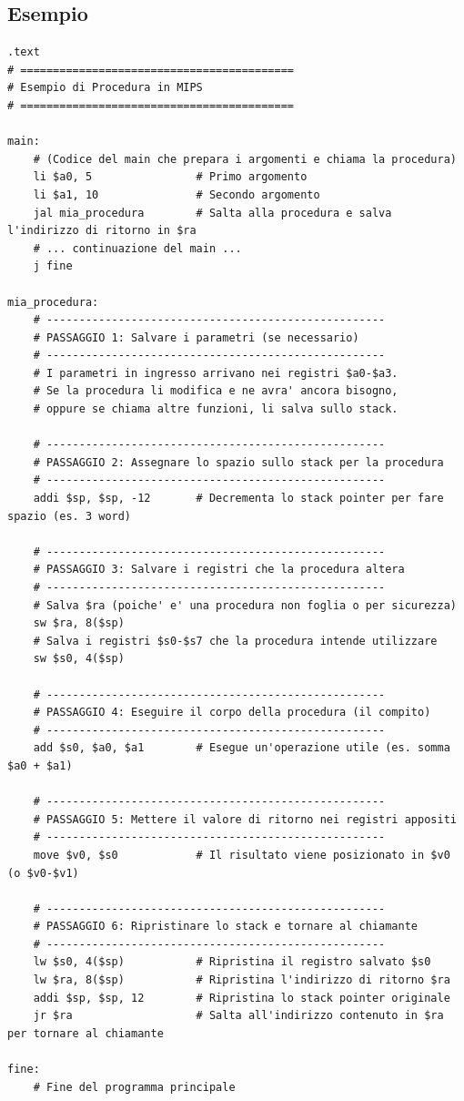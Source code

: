 \newpage
\subsection{Esempio}
\begin{lstlisting}
.text
# ==========================================
# Esempio di Procedura in MIPS
# ==========================================

main:
    # (Codice del main che prepara i argomenti e chiama la procedura)
    li $a0, 5                # Primo argomento
    li $a1, 10               # Secondo argomento
    jal mia_procedura        # Salta alla procedura e salva l'indirizzo di ritorno in $ra
    # ... continuazione del main ...
    j fine

mia_procedura:
    # ----------------------------------------------------
    # PASSAGGIO 1: Salvare i parametri (se necessario)
    # ----------------------------------------------------
    # I parametri in ingresso arrivano nei registri $a0-$a3. 
    # Se la procedura li modifica e ne avra' ancora bisogno, 
    # oppure se chiama altre funzioni, li salva sullo stack.
    
    # ----------------------------------------------------
    # PASSAGGIO 2: Assegnare lo spazio sullo stack per la procedura
    # ----------------------------------------------------
    addi $sp, $sp, -12       # Decrementa lo stack pointer per fare spazio (es. 3 word)

    # ----------------------------------------------------
    # PASSAGGIO 3: Salvare i registri che la procedura altera
    # ----------------------------------------------------
    # Salva $ra (poiche' e' una procedura non foglia o per sicurezza)
    sw $ra, 8($sp)          
    # Salva i registri $s0-$s7 che la procedura intende utilizzare
    sw $s0, 4($sp)          

    # ----------------------------------------------------
    # PASSAGGIO 4: Eseguire il corpo della procedura (il compito)
    # ----------------------------------------------------
    add $s0, $a0, $a1        # Esegue un'operazione utile (es. somma $a0 + $a1)
    
    # ----------------------------------------------------
    # PASSAGGIO 5: Mettere il valore di ritorno nei registri appositi
    # ----------------------------------------------------
    move $v0, $s0            # Il risultato viene posizionato in $v0 (o $v0-$v1)

    # ----------------------------------------------------
    # PASSAGGIO 6: Ripristinare lo stack e tornare al chiamante
    # ----------------------------------------------------
    lw $s0, 4($sp)           # Ripristina il registro salvato $s0
    lw $ra, 8($sp)           # Ripristina l'indirizzo di ritorno $ra
    addi $sp, $sp, 12        # Ripristina lo stack pointer originale
    jr $ra                   # Salta all'indirizzo contenuto in $ra per tornare al chiamante

fine:
    # Fine del programma principale
\end{lstlisting}

